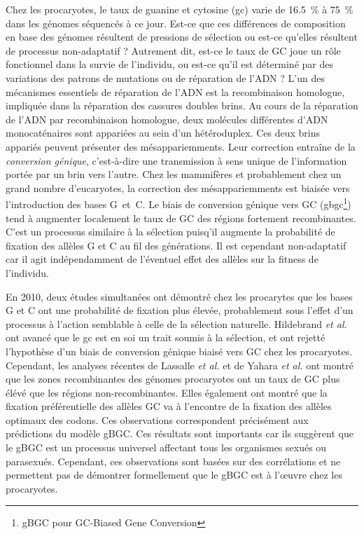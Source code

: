 Chez les procaryotes, le taux de guanine et cytosine (\ac{gc}) varie de
\SI{16.5}{\percent} à \SI{75}{\percent} dans les génomes séquencés à ce jour.
Est-ce que ces différences de composition en base des génomes résultent de
pressions de sélection ou est-ce qu'elles résultent de processus non-adaptatif ?
Autrement dit, est-ce le taux de GC joue un rôle fonctionnel dans la survie de
l'individu, ou est-ce qu'il est déterminé par des variations des patrons de
mutations ou de réparation de l'ADN ? L'un des mécanismes essentiels de
réparation de l'ADN est la recombinaison homologue, impliquée dans la réparation
des cassures doubles brins. Au cours de la réparation de l'ADN par recombinaison
homologue, deux molécules différentes d'ADN monocaténaires sont appariées au
sein d'un hétéroduplex. Ces deux brins appariés peuvent présenter des
mésappariemments. Leur correction entraîne de la \emph{conversion
  génique}\cite{chen_gene_2007}, c'est-à-dire une transmission à sens unique de
l'information portée par un brin vers l'autre. Chez les mammifères et
probablement chez un grand nombre d'eucaryotes, la correction des
mésappariemments est biaisée vers l'introduction des bases
G~et~C\cite{pessia_evidence_2012}. Le biais de conversion génique vers GC
(\ac{gbgc}\footnote{gBGC pour GC-Biased Gene Conversion}) tend à augmenter
localement le taux de GC des régions fortement
recombinantes\cite{duret_biased_2009,lesecque_gc-biased_2013,williams_non-crossover_2015}.
C'est un processus similaire à la sélection puisq'il augmente la probabilité de
fixation des allèles G et C au fil des générations. Il est cependant
non-adaptatif car il agit indépendamment de l'éventuel effet des allèles sur la
fitness de l'individu.

En 2010, deux études simultanées\cite{hildebrand_evidence_2010,
  hershberg_evidence_2010} ont démontré chez les procarytes que les bases G et C
ont une probabilité de fixation plus élevée, probablement sous l'effet d'un
processus à l'action semblable à celle de la sélection naturelle. Hildebrand
\emph{et al.} ont avancé que le \ac{gc} est en soi un trait soumis à la
sélection, et ont rejetté l'hypothèse d'un biais de conversion génique biaisé
vers GC chez les procaryotes. Cependant, les analyses récentes de Lassalle
\emph{et al.} \cite{lassalle_gc-content_2015} et de Yahara \emph{et
  al.}\cite{yahara_landscape_2016} ont montré que les zones recombinantes des
génomes procaryotes ont un taux de GC plus élévé que les régions
non-recombinantes. Elles également ont montré que la fixation préférentielle des
allèles GC va à l'encontre de la fixation des allèles optimaux des codons. Ces
observations correspondent précisément aux prédictions du modèle gBGC. Ces
résultats sont importants car ils suggèrent que le gBGC est un processus
universel affectant tous les organismes sexués ou parasexués. Cependant, ces
observations sont basées sur des corrélations et ne permettent pas de démontrer
formellement que le gBGC est à l'œuvre chez les procaryotes.

